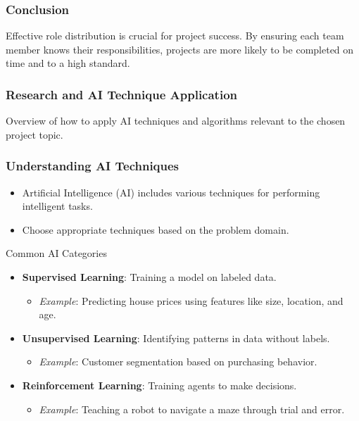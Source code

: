 \documentclass[aspectratio=169]{beamer}
\begin{document}
\begin{frame}[fragile]
    \frametitle{Conclusion}
    Effective role distribution is crucial for project success. 
    By ensuring each team member knows their responsibilities, projects are more likely to be completed on time and to a high standard.
\end{frame}

\begin{frame}[fragile]
  \frametitle{Research and AI Technique Application}
  Overview of how to apply AI techniques and algorithms relevant to the chosen project topic.
\end{frame}

\begin{frame}[fragile]
  \frametitle{Understanding AI Techniques}
  \begin{itemize}
    \item Artificial Intelligence (AI) includes various techniques for performing intelligent tasks.
    \item Choose appropriate techniques based on the problem domain.
  \end{itemize}
  \begin{block}{Common AI Categories}
    \begin{itemize}
      \item \textbf{Supervised Learning}: Training a model on labeled data.
        \begin{itemize}
          \item \textit{Example}: Predicting house prices using features like size, location, and age.
        \end{itemize}
      \item \textbf{Unsupervised Learning}: Identifying patterns in data without labels.
        \begin{itemize}
          \item \textit{Example}: Customer segmentation based on purchasing behavior.
        \end{itemize}
      \item \textbf{Reinforcement Learning}: Training agents to make decisions.
        \begin{itemize}
          \item \textit{Example}: Teaching a robot to navigate a maze through trial and error.
        \end{itemize}
    \end{itemize}
  \end{block}
\end{frame}
\end{document}
